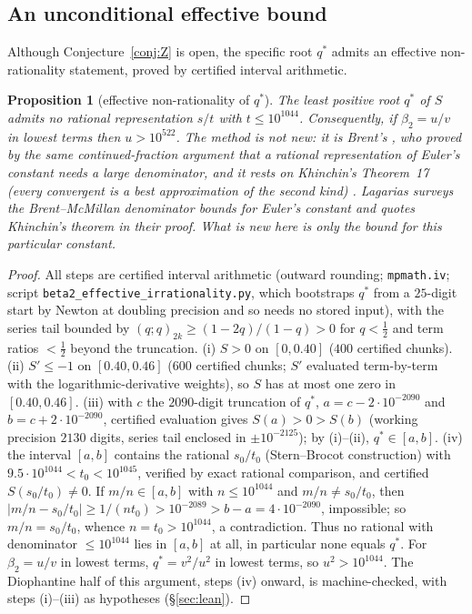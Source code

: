 \documentclass[11pt]{article}
\theoremstyle{plain}
\newtheorem{proposition}[theorem]{Proposition}
\theoremstyle{definition}
\theoremstyle{remark}
\begin{document}
\subsection{An unconditional effective bound}
Although Conjecture~\ref{conj:Z} is open, the specific root $q^\ast$ admits an effective
non-rationality statement, proved by certified interval arithmetic.

\begin{proposition}[effective non-rationality of $q^\ast$]
\label{prop:effective}
The least positive root $q^\ast$ of $S$ admits no rational representation $s/t$ with
$t\le10^{1044}$. Consequently, if $\beta_2=u/v$ in lowest terms then $u>10^{522}$. The method is
not new: it is Brent's \cite{Brent1977}, who proved by the same continued-fraction argument that a
rational representation of Euler's constant needs a large denominator, and it rests on Khinchin's
Theorem~17 (every convergent is a best approximation of the second kind)
\cite[Thm.~17]{Khinchin}. Lagarias \cite[\S3.15]{Lagarias2013} surveys the Brent--McMillan
denominator bounds for Euler's constant and quotes Khinchin's theorem in their proof. What is new
here is only the bound for this particular constant.
\end{proposition}

\begin{proof}
All steps are certified interval arithmetic (outward rounding; \texttt{mpmath.iv}; script
\texttt{beta2\_effective\_irrationality.py}, which bootstraps $q^\ast$ from a $25$-digit start by
Newton at doubling precision and so needs no stored input), with the series tail bounded by
$(q;q)_{2k}\ge(1-2q)/(1-q)>0$ for $q<\tfrac12$ and term ratios $<\tfrac12$ beyond the truncation.
\textup{(i)} $S>0$ on $[0,0.40]$ ($400$ certified chunks). \textup{(ii)} $S'\le-1$ on $[0.40,0.46]$
($600$ certified chunks; $S'$ evaluated term-by-term with the logarithmic-derivative weights), so
$S$ has at most one zero in $[0.40,0.46]$. \textup{(iii)} with $c$ the
$2090$-digit truncation of $q^\ast$, $a=c-2\cdot10^{-2090}$ and $b=c+2\cdot10^{-2090}$, certified
evaluation gives $S(a)>0>S(b)$ (working precision $2130$ digits, series tail enclosed in
$\pm10^{-2125}$); by \textup{(i)}--\textup{(ii)}, $q^\ast\in[a,b]$. \textup{(iv)} the interval
$[a,b]$ contains the rational $s_0/t_0$ (Stern--Brocot construction) with
$9.5\cdot10^{1044}<t_0<10^{1045}$, verified by exact rational comparison, and certified
$S(s_0/t_0)\ne0$. If $m/n\in[a,b]$ with $n\le10^{1044}$ and $m/n\ne s_0/t_0$, then
$|m/n-s_0/t_0|\ge1/(nt_0)>10^{-2089}>b-a=4\cdot10^{-2090}$, impossible; so $m/n=s_0/t_0$, whence
$n=t_0>10^{1044}$, a contradiction. Thus no rational with denominator $\le10^{1044}$ lies in
$[a,b]$ at all, in particular none equals $q^\ast$. For $\beta_2=u/v$ in lowest terms,
$q^\ast=v^2/u^2$ in lowest terms, so $u^2>10^{1044}$. The Diophantine half of this argument,
steps \textup{(iv)} onward, is machine-checked, with steps \textup{(i)}--\textup{(iii)} as
hypotheses (\S\ref{sec:lean}).
\end{proof}
\end{document}
